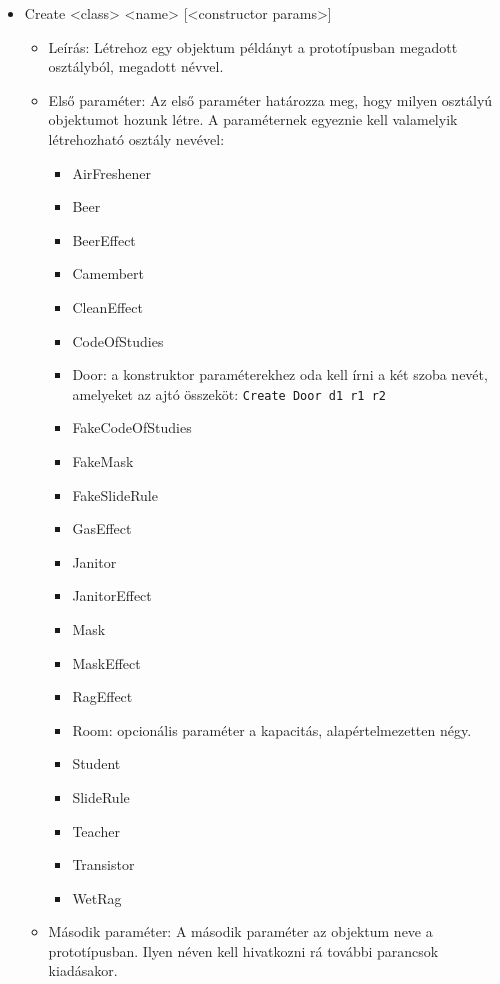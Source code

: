 \begin{itemize}
    \item Create <class> <name> [<constructor params>]
    \begin{itemize}
        \item Leírás: Létrehoz egy objektum példányt a prototípusban megadott osztályból, megadott névvel.
        \item Első paraméter: Az első paraméter határozza meg, hogy milyen osztályú objektumot hozunk létre. A paraméternek egyeznie kell valamelyik létrehozható osztály nevével:
        \begin{itemize}
        \item AirFreshener
        \item Beer
        \item BeerEffect
        \item Camembert
        \item CleanEffect
        \item CodeOfStudies
        \item Door: a konstruktor paraméterekhez oda kell írni a két szoba nevét, amelyeket az ajtó összeköt:
         \texttt{Create Door d1 r1 r2}
        \item FakeCodeOfStudies
        \item FakeMask
        \item FakeSlideRule
        \item GasEffect
        \item Janitor
        \item JanitorEffect
        \item Mask
        \item MaskEffect
        \item RagEffect
        \item Room: opcionális paraméter a kapacitás, alapértelmezetten négy.
        \item Student
        \item SlideRule
        \item Teacher
        \item Transistor
        \item WetRag
        \end{itemize}

        \item Második paraméter: A második paraméter az objektum neve a prototípusban. Ilyen néven kell hivatkozni rá további parancsok kiadásakor.
        
    \end{itemize}


\end{itemize}
